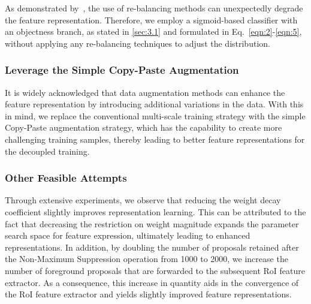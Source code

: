 \documentclass[lettersize,journal]{IEEEtran}
\begin{document}
As demonstrated by~\cite{zhou2020bbn}, the use of re-balancing methods can unexpectedly degrade the feature representation.
Therefore, we employ a sigmoid-based classifier with an objectness branch, as stated in \ref{sec:3.1} and formulated in Eq.~\eqref{eqn:2}-\eqref{eqn:5}, without applying any re-balancing techniques to adjust the distribution.


\subsubsection{Leverage the Simple Copy-Paste Augmentation~\cite{ghiasi2021simple}}
It is widely acknowledged that data augmentation methods can enhance the feature representation by introducing additional variations in the data. With this in mind, we replace the conventional multi-scale training strategy with the simple Copy-Paste augmentation strategy, which has the capability to create more challenging training samples, thereby leading to better feature representations for the decoupled training.


\subsubsection{Other Feasible Attempts}

Through extensive experiments, we observe that reducing the weight decay coefficient slightly improves representation learning. This can be attributed to the fact that decreasing the restriction on weight magnitude expands the parameter search space for feature expression, ultimately leading to enhanced representations.
In addition, by doubling the number of proposals retained after the Non-Maximum Suppression operation from 1000 to 2000, we increase the number of foreground proposals that are forwarded to the subsequent RoI feature extractor.
As a consequence, this increase in quantity aids in the convergence of the RoI feature extractor and yields slightly improved feature representations.
\end{document}

